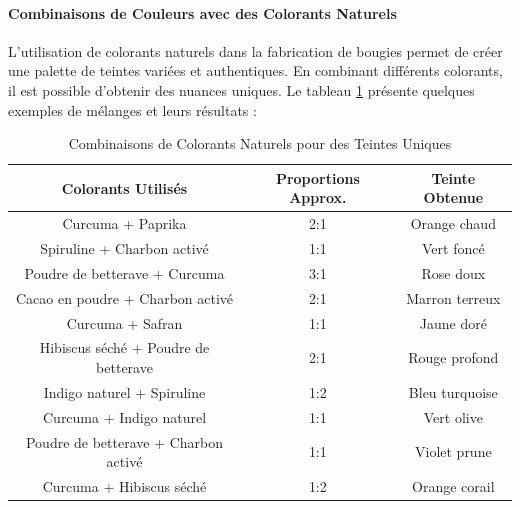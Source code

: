 \documentclass[11pt,fleqn,onecolumn,oneside]{book}
\begin{document}
\paragraph{Combinaisons de Couleurs avec des Colorants Naturels}

L'utilisation de colorants naturels dans la fabrication de bougies permet de créer une palette de teintes variées et authentiques. En combinant différents colorants, il est possible d'obtenir des nuances uniques. Le tableau \ref{tab:colorants_naturels} présente quelques exemples de mélanges et leurs résultats :

\begin{table}[htbp]
    \centering
    \renewcommand{\arraystretch}{1.5} %
    \setlength{\tabcolsep}{10pt} %
    \begin{tabular}{|>{\columncolor[gray]{0.9}}c|c|c|}
        \hline
        \rowcolor[HTML]{D9EAD3} \textbf{Colorants Utilisés} & \textbf{Proportions Approx.} & \textbf{Teinte Obtenue} \\
        \hline
        Curcuma + Paprika & 2:1 & Orange chaud \\
        \hline
        Spiruline + Charbon activé & 1:1 & Vert foncé \\
        \hline
        Poudre de betterave + Curcuma & 3:1 & Rose doux \\
        \hline
        Cacao en poudre + Charbon activé & 2:1 & Marron terreux \\
        \hline
        Curcuma + Safran & 1:1 & Jaune doré \\
        \hline
        Hibiscus séché + Poudre de betterave & 2:1 & Rouge profond \\
        \hline
        Indigo naturel + Spiruline & 1:2 & Bleu turquoise \\
        \hline
        Curcuma + Indigo naturel & 1:1 & Vert olive \\
        \hline
        Poudre de betterave + Charbon activé & 1:1 & Violet prune \\
        \hline
        Curcuma + Hibiscus séché & 1:2 & Orange corail \\
        \hline
    \end{tabular}
    \caption{Combinaisons de Colorants Naturels pour des Teintes Uniques}
    \label{tab:colorants_naturels}
\end{table}
\end{document}
